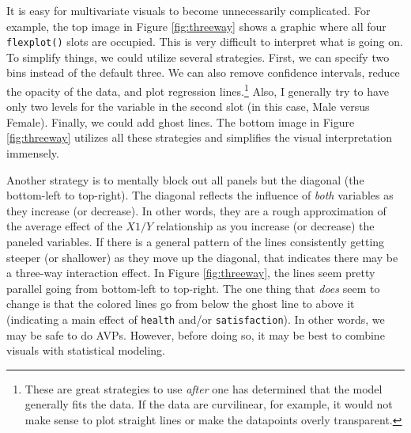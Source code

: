 \documentclass[
  man]{apa6}
\begin{document}
It is easy for multivariate visuals to become unnecessarily complicated. For example, the top image in Figure \ref{fig:threeway} shows a graphic where all four \texttt{flexplot()} slots are occupied. This is very difficult to interpret what is going on. To simplify things, we could utilize several strategies. First, we can specify two bins instead of the default three. We can also remove confidence intervals, reduce the opacity of the data, and plot regression lines.\footnote{These are great strategies to use \emph{after} one has determined that the model generally fits the data. If the data are curvilinear, for example, it would not make sense to plot straight lines or make the datapoints overly transparent.} Also, I generally try to have only two levels for the variable in the second slot (in this case, Male versus Female). Finally, we could add ghost lines. The bottom image in Figure \ref{fig:threeway} utilizes all these strategies and simplifies the visual interpretation immensely.

Another strategy is to mentally block out all panels but the diagonal (the bottom-left to top-right). The diagonal reflects the influence of \emph{both} variables as they increase (or decrease). In other words, they are a rough approximation of the average effect of the \(X1/Y\) relationship as you increase (or decrease) the paneled variables. If there is a general pattern of the lines consistently getting steeper (or shallower) as they move up the diagonal, that indicates there may be a three-way interaction effect. In Figure \ref{fig:threeway}, the lines seem pretty parallel going from bottom-left to top-right. The one thing that \emph{does} seem to change is that the colored lines go from below the ghost line to above it (indicating a main effect of \texttt{health} and/or \texttt{satisfaction}). In other words, we may be safe to do AVPs. However, before doing so, it may be best to combine visuals with statistical modeling.
\end{document}
